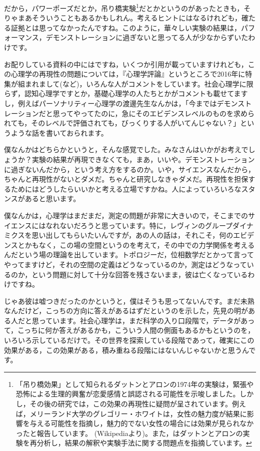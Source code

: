 \documentclass{ltjsbook}
\begin{document}
だから，パワーポーズだとか，吊り橋実験\footnote{「吊り橋効果」として知られるダットンとアロンの1974年の実験は，緊張や恐怖による生理的興奮が恋愛感情と誤認される可能性を示唆しました。しかし，その後の研究では，この効果の再現性に疑問が呈されています。例えば，メリーランド大学のグレゴリー・ホワイトは，女性の魅力度が結果に影響を与える可能性を指摘し，魅力的でない女性の場合には効果が見られなかったと報告しています。 (Wikipediaより)。また，\textcite{Saito_DA}はダットンとアロンの実験を再分析し，結果の解釈や実験手法に関する問題点を指摘しています。 }だとかというのがあったときも，そりゃまあそういうこともあるかもしれん。考えるヒントにはなるけれども，確たる証拠とは思ってなかったんですね。このように，華々しい実験の結果は，パフォーマンス，デモンストレーションに過ぎないと思ってる人が少なからずいたわけです。

お配りしている資料の中にはですね，いくつか引用が載っていますけれども，この心理学の再現性の問題については，『心理学評論』というところで2016年に特集が組まれまして(\textcite{Ikeda2016}など)，いろんな人がコメントをしています。社会心理学に限らず，認知心理学ですとか，基礎心理学の人たちとかがコメントも載せてますし，例えばパーソナリティー心理学の渡邊先生なんかは，「今まではデモンストレーションだと思ってやってたのに，急にそのエビデンスレベルのものを求められても，そのレベルで評価されても，びっくりする人がいてんじゃない？」というような話を書いておられます\parencite{Watanabe2016}。

僕なんかはどちらかというと，そんな感覚でした。みなさんはいかがお考えでしょうか？実験の結果が再現できなくても，まあ，いいや。デモンストレーションに過ぎないんだから，という考え方をするのか。いや，サイエンスなんだから，ちゃんと再現性がないとダメだ。ちゃんと研究しなきゃダメだ。再現性を担保するためにはどうしたらいいかと考える立場ですかね。人によっていろいろなスタンスがあると思います。

僕なんかは，心理学はまだまだ，測定の問題が非常に大きいので，そこまでのサイエンスにはなれないだろうと思っています。特に，レヴィンのグループダイナミクスを思い出してもらいたいんですが，あの人の話は，それこそ，何のエビデンスとかもなく，この場の空間というのを考えて，その中での力学関係を考えるんだという場の理論を出しています。トポロジーだ，位相数学だとかって言ってやってますけど，それの空間の定義はどうなっているのか，測定はどうなっているのか，という問題に対して十分な回答を残さないまま，彼は亡くなっているわけですね。


じゃあ彼は嘘つきだったのかというと，僕はそうも思ってないんです。まだ未熟なんだけど，こっちの方向に答えがあるはずだというのを示した，先見の明がある人だと思っています。社会心理学は，まだ科学の入り口段階で，データがあって，こっちに何か答えがあるかも，こういう人間の側面もあるかもというのを，いろいろ示しているだけで。その世界を探索している段階であって，確実にこの効果がある，この効果がある，積み重ねる段階にはないんじゃないかと思うんです。
\end{document}
